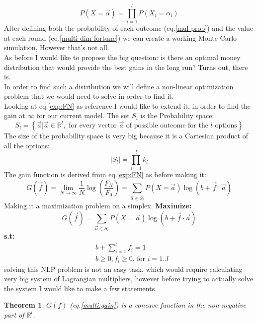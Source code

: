 \documentclass{article}
\newtheorem{thm}{Theorem}[section]
\begin{document}
	\begin{equation}
		\label{mul-prob}
		P(X = \overrightarrow{\alpha}) = \prod_{i = 1}^l P(X_i = \alpha_i)
	\end{equation}
	After defining both the probability of each outcome (eq.\ref{mul-prob}) and the value at each round (eq.\ref{multi-dim-fortune}) we can create a working Monte-Carlo simulation, However that's not all.\\
	As before I would like to propose the big question: is there an optimal money distribution that would provide the best gains in the long run?
	Turns out, there is.\\
	In order to find such a distribution we will define a non-linear optimization problem that we would need to solve in order to find it.\\
	Looking at eq.\ref{exp:FN} as reference I would like to extend it, in order to find the gain at $\infty$ for our current model.
	\newpage
	The set $S_l$ is the Probability space:
	\[S_l = \left\{\overrightarrow{a}|\overrightarrow{a} \in \mathbb{R}^l, \text{ for every vector } \overrightarrow{a} \text{ of possible outcome for the } l \text{ options} \right\}\]
	The size of the probability space is very big because it is a Cartesian product of all the options:
	\[|S_l| = \prod_{i=1}^{l} k_l\]
	The gain function is derived from eq.\ref{exp:FN} as before making it:
	\begin{equation}
		\label{multi:gain}
		G(\overrightarrow{f}) = \lim_{N \to \infty} \frac{1}{N}\log(\frac{F_N}{F_0}) = \sum_{\overrightarrow{a} \in S_l} P(X=\overrightarrow{a})\log(b + \overrightarrow{f} \cdot \overrightarrow{a} )
	\end{equation}
	Making it a maximization problem on a simplex.
	\newline \newline
	\textbf{Maximize:} \[
		G(\overrightarrow{f}) = \sum_{\overrightarrow{a} \in S_l} P(X=\overrightarrow{a})\log(b + \overrightarrow{f} \cdot \overrightarrow{a} )
		\]
	\textbf{s.t:}
	\[
	\begin{aligned}
		&b + \sum_{i=1}^{l} f_i = 1\\
		&b\ge 0,f_i \ge 0 \text{, for } i=1..l
	\end{aligned}
	\]
	solving this NLP problem is not an easy task, which would require calculating very big system of Lagrangian multipliers, however before trying to actually solve the system I would like to make a few statements.
	\begin{thm}
		$G(f)$ (eq.\ref{multi:gain}) is a concave function in the non-negative part of $\mathbb{R}^l$.
	\end{thm}
\end{document}
